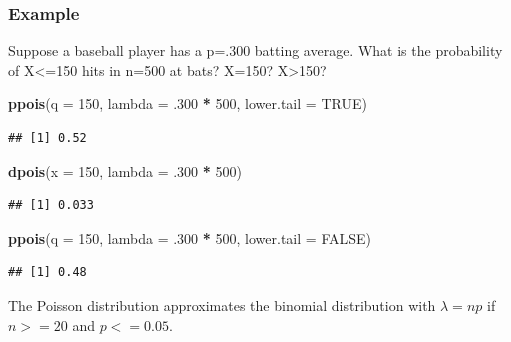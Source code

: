 \documentclass[
]{book}
\newenvironment{Shaded}{\begin{snugshade}}{\end{snugshade}}
\newcommand{\DataTypeTok}[1]{\textcolor[rgb]{0.13,0.29,0.53}{#1}}
\newcommand{\DecValTok}[1]{\textcolor[rgb]{0.00,0.00,0.81}{#1}}
\newcommand{\FloatTok}[1]{\textcolor[rgb]{0.00,0.00,0.81}{#1}}
\newcommand{\KeywordTok}[1]{\textcolor[rgb]{0.13,0.29,0.53}{\textbf{#1}}}
\newcommand{\NormalTok}[1]{#1}
\newcommand{\OperatorTok}[1]{\textcolor[rgb]{0.81,0.36,0.00}{\textbf{#1}}}
\newcommand{\OtherTok}[1]{\textcolor[rgb]{0.56,0.35,0.01}{#1}}
\newcommand{\StringTok}[1]{\textcolor[rgb]{0.31,0.60,0.02}{#1}}
\begin{document}
\hypertarget{example-5}{%
\subsubsection*{Example}\label{example-5}}

Suppose a baseball player has a p=.300 batting average. What is the probability of X\textless=150 hits in n=500 at bats? X=150? X\textgreater150?

\begin{Shaded}
\begin{Highlighting}[]
\KeywordTok{ppois}\NormalTok{(}\DataTypeTok{q =} \DecValTok{150}\NormalTok{, }\DataTypeTok{lambda =} \FloatTok{.300} \OperatorTok{*}\StringTok{ }\DecValTok{500}\NormalTok{, }\DataTypeTok{lower.tail =} \OtherTok{TRUE}\NormalTok{)}
\end{Highlighting}
\end{Shaded}

\begin{verbatim}
## [1] 0.52
\end{verbatim}

\begin{Shaded}
\begin{Highlighting}[]
\KeywordTok{dpois}\NormalTok{(}\DataTypeTok{x =} \DecValTok{150}\NormalTok{, }\DataTypeTok{lambda =} \FloatTok{.300} \OperatorTok{*}\StringTok{ }\DecValTok{500}\NormalTok{)}
\end{Highlighting}
\end{Shaded}

\begin{verbatim}
## [1] 0.033
\end{verbatim}

\begin{Shaded}
\begin{Highlighting}[]
\KeywordTok{ppois}\NormalTok{(}\DataTypeTok{q =} \DecValTok{150}\NormalTok{, }\DataTypeTok{lambda =} \FloatTok{.300} \OperatorTok{*}\StringTok{ }\DecValTok{500}\NormalTok{, }\DataTypeTok{lower.tail =} \OtherTok{FALSE}\NormalTok{) }
\end{Highlighting}
\end{Shaded}

\begin{verbatim}
## [1] 0.48
\end{verbatim}

The Poisson distribution approximates the binomial distribution with \(\lambda=np\) if \(n>=20\) and \(p<=0.05\).
\end{document}
